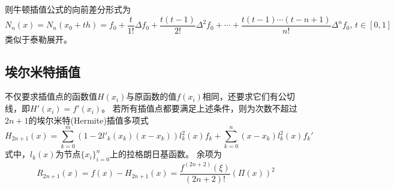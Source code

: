则牛顿插值公式的向前差分形式为
\[N_n(x)=N_n(x_0+th)=f_0+\frac{t}{1!}\Delta f_0+\frac{t(t-1)}{2!}\Delta^2 f_0+\cdots+\frac{t(t-1)\cdots(t-n+1)}{n!}\Delta^n f_0,\,t\in[0,1]\]
类似于泰勒展开。

\subsection{埃尔米特插值}
不仅要求插值点的函数值$H(x_i)$与原函数的值$f(x_i)$相同，还要求它们有公切线，即$H'(x_i)=f'(x_i)$。
若所有插值点都要满足上述条件，则为次数不超过$2n+1$的埃尔米特(Hermite)插值多项式
\[H_{2n+1}(x)=\sum_{k=0}^m(1-2l'_k(x_k)(x-x_k))l_k^2(x)f_k+\sum_{k=0}^n(x-x_k)l_k^2(x)f_k'\]
式中，$l_k(x)$为节点$\{x_i\}_{i=0}^n$上的拉格朗日基函数。
余项为
\[R_{2n+1}(x)=f(x)-H_{2n+1}(x)=\frac{f^{(2n+2)}(\xi)}{(2n+2)!}(\Pi(x))^2\]

